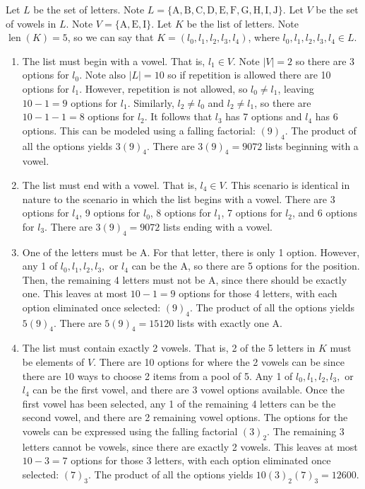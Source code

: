 \documentclass{article}
\theoremstyle{definition}
\DeclareMathOperator{\len}{len}
\begin{document}
\begin{solution}
Let $L$ be the set of letters. Note $L=\{\mathrm{A},\mathrm{B},\mathrm{C},\mathrm{D},\mathrm{E},\mathrm{F},\mathrm{G},\mathrm{H},\mathrm{I},\mathrm{J}\}$. Let $V$ be the set of vowels in $L$. Note $V=\{\mathrm{A},\mathrm{E},\mathrm{I}\}$. Let $K$ be the list of letters. Note $\len(K)=5$, so we can say that $K=(l_0,l_1,l_2,l_3,l_4)$, where $l_0,l_1,l_2,l_3,l_4\in L$. 
\begin{enumerate}
\item The list must begin with a vowel. That is, $l_1\in V$. Note $|V|=2$ so there are 3 options for $l_0$. Note also $|L|=10$ so if repetition is allowed there are 10 options for $l_1$. However, repetition is not allowed, so $l_0\neq l_1$, leaving $10-1=9$ options for $l_1$. Similarly, $l_2\neq l_0$ and $l_2\neq l_1$, so there are $10-1-1=8$ options for $l_2$. It follows that $l_3$ has 7 options and $l_4$ has 6 options. This can be modeled using a falling factorial: $(9)_4$. The product of all the options yields $3(9)_4$. There are $3(9)_4=9072$ lists beginning with a vowel.
\item The list must end with a vowel. That is, $l_4\in V$. This scenario is identical in nature to the scenario in which the list begins with a vowel. There are 3 options for $l_4$, 9 options for $l_0$, 8 options for $l_1$, 7 options for $l_2$, and 6 options for $l_3$. There are $3(9)_4=9072$ lists ending with a vowel.
\item One of the letters must be A. For that letter, there is only 1 option. However, any 1 of $l_0,l_1,l_2,l_3,$ or $l_4$ can be the A, so there are 5 options for the position. Then, the remaining 4 letters must not be A, since there should be exactly one. This leaves at most $10-1=9$ options for those 4 letters, with each option eliminated once selected: $(9)_4$. The product of all the options yields $5(9)_4$. There are $5(9)_4=15120$ lists with exactly one A.
\item The list must contain exactly 2 vowels. That is, 2 of the 5 letters in $K$ must be elements of $V$. There are 10 options for where the 2 vowels can be since there are 10 ways to choose 2 items from a pool of 5. Any 1 of $l_0,l_1,l_2,l_3,$ or $l_4$ can be the first vowel, and there are 3 vowel options available. Once the first vowel has been selected, any 1 of the remaining 4 letters can be the second vowel, and there are 2 remaining vowel options. The options for the vowels can be expressed using the falling factorial $(3)_2$. The remaining 3 letters cannot be vowels, since there are exactly 2 vowels. This leaves at most $10-3=7$ options for those 3 letters, with each option eliminated once selected: $(7)_3$. The product of all the options yields $10(3)_2(7)_3=12600$.
\end{enumerate}
\end{solution}
\end{document}
